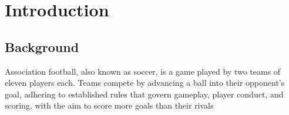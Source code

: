 \section{Introduction}

\subsection{Background}

Association football, also known as soccer, is a game played by two teams of eleven players each. Teams compete by advancing a ball into their opponent's goal, adhering to established rules that govern gameplay, player conduct, and scoring, with the aim to score more goals than their rivals \cite{}